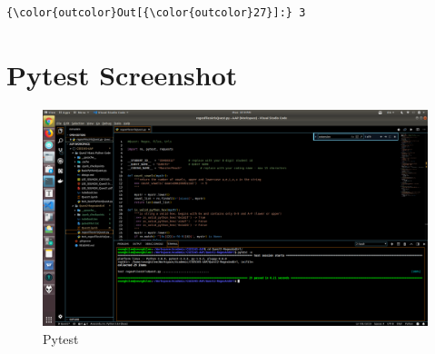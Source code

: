 \documentclass[11pt]{article}
\makeatletter
\def\maxwidth{\ifdim\Gin@nat@width>\linewidth\linewidth
    \else\Gin@nat@width\fi}
\let\Oldincludegraphics\includegraphics
\renewcommand{\includegraphics}[1]{\Oldincludegraphics[width=.8\maxwidth]{#1}}
\makeatother
\begin{document}
\begin{Verbatim}[commandchars=\\\{\}]
{\color{outcolor}Out[{\color{outcolor}27}]:} 3
\end{Verbatim}
            
    \section{Pytest Screenshot}\label{pytest-screenshot}

    \begin{figure}
\centering
\includegraphics{./pytest2.png}
\caption{Pytest}
\end{figure}


    
    
    
    
\end{document}
